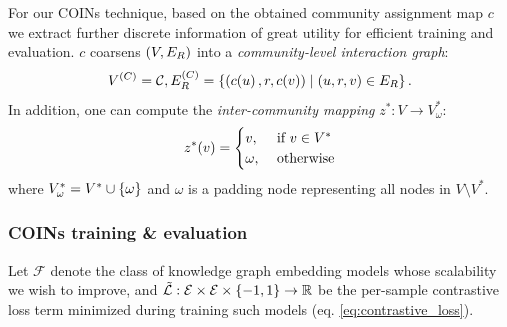 
For our COINs technique, based on the obtained community assignment map $c$ we extract further discrete information of great utility for efficient training and evaluation. $c$ coarsens $\mathopen{}\left(V, E_R\right)$ into a \emph{community-level interaction graph}: $$V^{\mathopen{}\left(C\right)} = \mathcal{C}, E^{\mathopen{}\left(C\right)}_R = \mathopen{}\left\{\mathopen{}\left(c\mathopen{}\left(u\right),r,c\mathopen{}\left(v\right)\right) \mid \mathopen{}\left(u,r,v\right) \in E_R\right\}.$$%
In addition, one can compute the \emph{inter-community mapping} $z^*: V \to V_{\omega}^*$:
$$z^*\mathopen{}\left(v\right)=\begin{cases} v, & \text{ if } v \in V^* \\ \omega, & \text{ otherwise} \end{cases}$$where $V_{\omega}^* = V^* \cup \mathopen{}\left\{\omega\right\}$ and $\omega$ is a padding node representing all nodes in $V \setminus V^*$.

\subsubsection{COINs training \& evaluation}


Let $\mathcal{F}$ denote the class of knowledge graph embedding models whose scalability we wish to improve, and $\tilde{\mathcal{L}}: \mathcal{E} \times \mathcal{E} \times \mathopen{}\left\{-1,1\right\} \to \mathbb{R}$ be the per-sample contrastive loss term minimized during training such models (eq. \eqref{eq:contrastive_loss}). 

